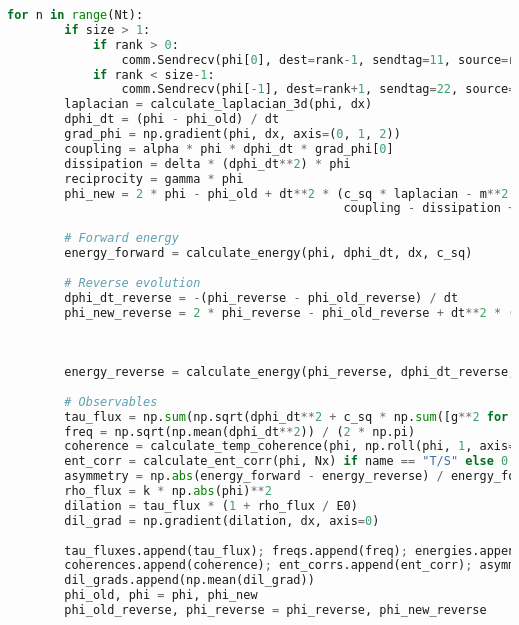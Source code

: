 \documentclass[11pt]{article}
\begin{document}
\begin{lstlisting}[language=Python, caption={Fluxonic Time Evolution Simulation}, label=lst:time]
    for n in range(Nt):
        if size > 1:
            if rank > 0:
                comm.Sendrecv(phi[0], dest=rank-1, sendtag=11, source=rank-1, recvtag=22)
            if rank < size-1:
                comm.Sendrecv(phi[-1], dest=rank+1, sendtag=22, source=rank+1, recvtag=11)
        laplacian = calculate_laplacian_3d(phi, dx)
        dphi_dt = (phi - phi_old) / dt
        grad_phi = np.gradient(phi, dx, axis=(0, 1, 2))
        coupling = alpha * phi * dphi_dt * grad_phi[0]
        dissipation = delta * (dphi_dt**2) * phi
        reciprocity = gamma * phi
        phi_new = 2 * phi - phi_old + dt**2 * (c_sq * laplacian - m**2 * phi - g * phi**3 - eta * phi**5 + 
                                               coupling - dissipation + reciprocity + 8 * np.pi * G * k * phi**2)
        
        # Forward energy
        energy_forward = calculate_energy(phi, dphi_dt, dx, c_sq)
        
        # Reverse evolution
        dphi_dt_reverse = -(phi_reverse - phi_old_reverse) / dt
        phi_new_reverse = 2 * phi_reverse - phi_old_reverse + dt**2 * (c_sq * laplacian - m**2 * phi_reverse - 
                                                                       g * phi_reverse**3 - eta * phi_reverse**5 + 
                                                                       coupling - dissipation + reciprocity + 
                                                                       8 * np.pi * G * k * phi_reverse**2)
        energy_reverse = calculate_energy(phi_reverse, dphi_dt_reverse, dx, c_sq)
        
        # Observables
        tau_flux = np.sum(np.sqrt(dphi_dt**2 + c_sq * np.sum([g**2 for g in grad_phi], axis=0))) * dx**3
        freq = np.sqrt(np.mean(dphi_dt**2)) / (2 * np.pi)
        coherence = calculate_temp_coherence(phi, np.roll(phi, 1, axis=0))
        ent_corr = calculate_ent_corr(phi, Nx) if name == "T/S" else 0
        asymmetry = np.abs(energy_forward - energy_reverse) / energy_forward * 100
        rho_flux = k * np.abs(phi)**2
        dilation = tau_flux * (1 + rho_flux / E0)
        dil_grad = np.gradient(dilation, dx, axis=0)
        
        tau_fluxes.append(tau_flux); freqs.append(freq); energies.append(energy_forward)
        coherences.append(coherence); ent_corrs.append(ent_corr); asymmetries.append(asymmetry)
        dil_grads.append(np.mean(dil_grad))
        phi_old, phi = phi, phi_new
        phi_old_reverse, phi_reverse = phi_reverse, phi_new_reverse
    

\end{lstlisting}
\end{document}
